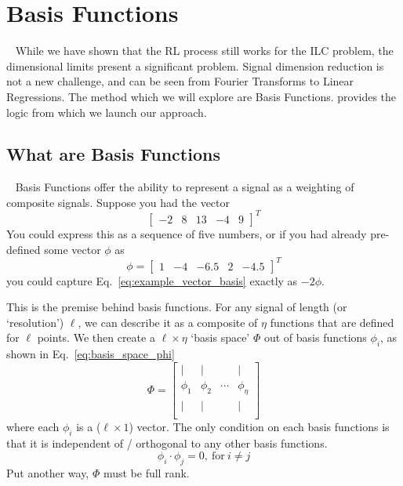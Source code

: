 
\FloatBarrier\section{Basis Functions}
~\label{sec:basis_functions}
While we have shown that the RL process still works for the ILC problem, the dimensional limits present a significant problem. Signal dimension reduction is not a new challenge, and can be seen from Fourier Transforms to Linear Regressions. The method which we will explore are Basis Functions.  provides the logic from which we launch our approach. 

\FloatBarrier\subsection{What are Basis Functions}
~\label{sub:what_are_basis}
Basis Functions offer the ability to represent a signal as a weighting of composite signals. Suppose you had the vector
\begin{equation}
    \begin{bmatrix}
        -2 & 8 & 13 & -4 & 9
    \end{bmatrix}^T
    \label{eq:example_vector_basis}
\end{equation}
You could express this as a sequence of five numbers, or if you had already pre-defined some vector $\phi$ as
\begin{equation}
    \phi = 
    \begin{bmatrix}
        1 & -4 & -6.5 & 2 & -4.5
    \end{bmatrix}^T
\end{equation}
you could capture Eq.~\ref{eq:example_vector_basis} exactly as $-2\phi$. 

This is the premise behind basis functions. For any signal of length (or `resolution') $\ell$, we can describe it as a composite of $\eta$ functions that are defined for $\ell$ points. We then create a $\ell \times \eta$ `basis space' $\Phi$ out of basis functions $\phi_i$, as shown in Eq.~\ref{eq:basis_space_phi}
\begin{equation}
    \Phi = 
    \begin{bmatrix}
        | & | &  & | \\
        \phi_1 & \phi_2 & \cdots & \phi_{\eta} \\
        | & | &  & | \\
    \end{bmatrix}
    \label{eq:basis_space_phi}
\end{equation}
where each $\phi_i$ is a ($\ell \times 1$) vector. The only condition on each basis functions is that it is independent of / orthogonal to any other basis functions.
\begin{equation}
    \phi_i \cdot \phi_j = 0,\ \text{for}\ i \ne j
    \label{eq:orthogonal_basis}
\end{equation}
Put another way, $\Phi$ must be full rank. 

